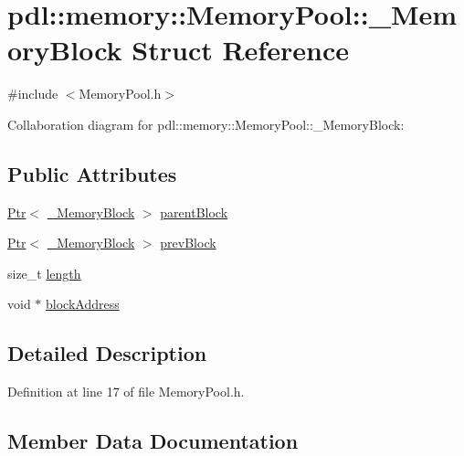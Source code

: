 \hypertarget{structpdl_1_1memory_1_1_memory_pool_1_1___memory_block}{}\section{pdl\+::memory\+::Memory\+Pool\+::\+\_\+\+Memory\+Block Struct Reference}
\label{structpdl_1_1memory_1_1_memory_pool_1_1___memory_block}


{\ttfamily \#include $<$Memory\+Pool.\+h$>$}



Collaboration diagram for pdl\+::memory\+::Memory\+Pool\+::\+\_\+\+Memory\+Block\+:
\subsection*{Public Attributes}
\begin{DoxyCompactItemize}
\item 
\mbox{\hyperlink{classpdl_1_1memory_1_1_ptr}{Ptr}}$<$ \mbox{\hyperlink{structpdl_1_1memory_1_1_memory_pool_1_1___memory_block}{\+\_\+\+Memory\+Block}} $>$ \mbox{\hyperlink{structpdl_1_1memory_1_1_memory_pool_1_1___memory_block_a4282477912184958f58f89256fbd1932}{parent\+Block}}
\item 
\mbox{\hyperlink{classpdl_1_1memory_1_1_ptr}{Ptr}}$<$ \mbox{\hyperlink{structpdl_1_1memory_1_1_memory_pool_1_1___memory_block}{\+\_\+\+Memory\+Block}} $>$ \mbox{\hyperlink{structpdl_1_1memory_1_1_memory_pool_1_1___memory_block_acf1a6c60be327ff02203244b8de90aea}{prev\+Block}}
\item 
size\+\_\+t \mbox{\hyperlink{structpdl_1_1memory_1_1_memory_pool_1_1___memory_block_ac304144171c6877b41ccb5b35fb7fbd6}{length}}
\item 
void $\ast$ \mbox{\hyperlink{structpdl_1_1memory_1_1_memory_pool_1_1___memory_block_a38f2189a9d55cc0224e45abc7819aa99}{block\+Address}}
\end{DoxyCompactItemize}


\subsection{Detailed Description}


Definition at line 17 of file Memory\+Pool.\+h.



\subsection{Member Data Documentation}
\mbox{\label{structpdl_1_1memory_1_1_memory_pool_1_1___memory_block_a38f2189a9d55cc0224e45abc7819aa99}} 

